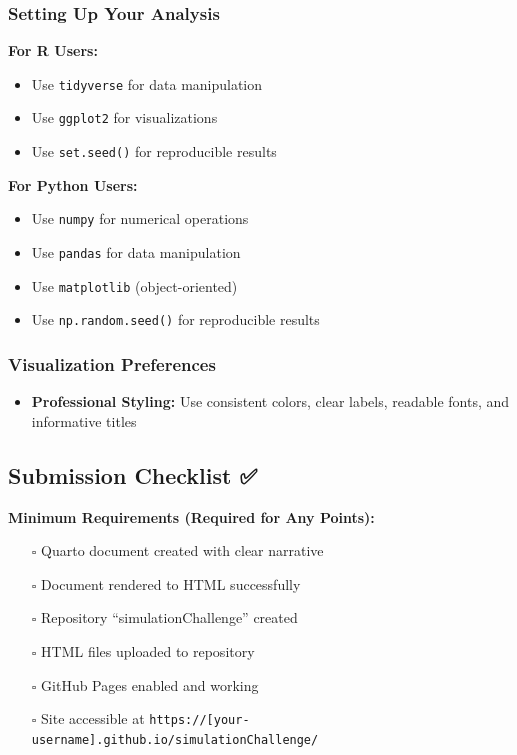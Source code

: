 \documentclass[
  letterpaper,
  DIV=11,
  numbers=noendperiod]{scrartcl}
\providecommand{\tightlist}{%
  \setlength{\itemsep}{0pt}\setlength{\parskip}{0pt}}
\theoremstyle{definition}
\theoremstyle{remark}
\begin{document}
\subsubsection{Setting Up Your Analysis}\label{setting-up-your-analysis}

\textbf{For R Users:}

\begin{itemize}
\tightlist
\item
  Use \texttt{tidyverse} for data manipulation
\item
  Use \texttt{ggplot2} for visualizations
\item
  Use \texttt{set.seed()} for reproducible results
\end{itemize}

\textbf{For Python Users:}

\begin{itemize}
\tightlist
\item
  Use \texttt{numpy} for numerical operations
\item
  Use \texttt{pandas} for data manipulation
\item
  Use \texttt{matplotlib} (object-oriented)
\item
  Use \texttt{np.random.seed()} for reproducible results
\end{itemize}

\subsubsection{Visualization
Preferences}\label{visualization-preferences}

\begin{itemize}
\tightlist
\item
  \textbf{Professional Styling:} Use consistent colors, clear labels,
  readable fonts, and informative titles
\end{itemize}

\subsection{Submission Checklist ✅}\label{submission-checklist}

\textbf{Minimum Requirements (Required for Any Points):}

\begin{itemize}
\tightlist
\item[$\square$]
  Quarto document created with clear narrative
\item[$\square$]
  Document rendered to HTML successfully
\item[$\square$]
  Repository ``simulationChallenge'' created
\item[$\square$]
  HTML files uploaded to repository
\item[$\square$]
  GitHub Pages enabled and working
\item[$\square$]
  Site accessible at
  \texttt{https://{[}your-username{]}.github.io/simulationChallenge/}
\end{itemize}
\end{document}

